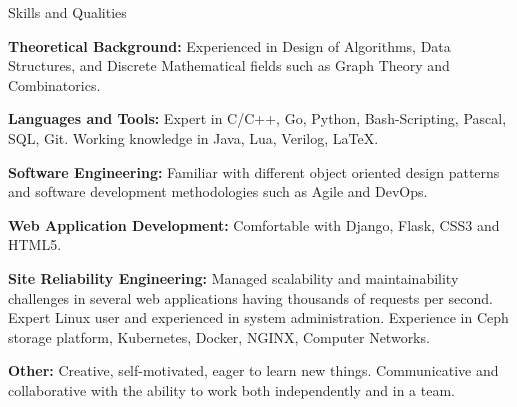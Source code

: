 \documentclass{resume} %
\begin{document}
\begin{rSection}{Skills and Qualities}
	
	{\bf Theoretical Background:}
	Experienced in Design of Algorithms, Data Structures, and Discrete Mathematical fields such as Graph Theory and Combinatorics.
	
	{\bf Languages and Tools:}
	Expert in C/C++, Go, Python, Bash-Scripting, Pascal, SQL, Git. Working knowledge in Java, Lua, Verilog, \LaTeX.
	
	{\bf Software Engineering:}
	Familiar with different object oriented design patterns and software development methodologies such as Agile and DevOps.
	
	{\bf Web Application Development:}
	Comfortable with Django, Flask, CSS3 and HTML5.
	
	{\bf Site Reliability Engineering:}
	Managed scalability and maintainability challenges in several web applications having thousands of requests per second.
	Expert Linux user and experienced in system administration.
	Experience in Ceph storage platform, Kubernetes, Docker, NGINX, Computer Networks.
	
	{\bf Other:}
	Creative, self-motivated, eager to learn new things. Communicative and collaborative with the ability to work both independently and in a team.
	
\end{rSection}
	
\end{document}

